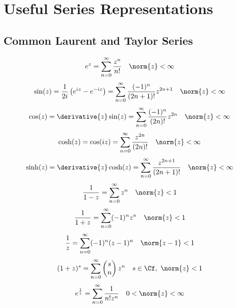 \documentclass[../mmf.tex]{subfiles}
\begin{document}
\chapter{Useful Series Representations}
\section{Common Laurent and Taylor Series}
\begin{equation}
	e^z=\sum_{n=0}^\infty\frac{z^n}{n!}\quad\norm{z}<\infty
	\label{eq:expser}
\end{equation}
\begin{equation}
	\sin(z)=\frac{1}{2i}\left( e^{iz}-e^{-iz} \right)=\sum_{n=0}^{\infty}\frac{(-1)^n}{(2n+1)!}z^{2n+1}\quad\norm{z}<\infty
	\label{eq:sinser}
\end{equation}
\begin{equation}
	\cos(z)=\derivative{z}\sin(z)=\sum_{n=0}^{\infty}\frac{(-1)^n}{(2n)!}z^{2n}\quad\norm{z}<\infty
	\label{eq:cosser}
\end{equation}
\begin{equation}
	\cosh(z)=\cos(iz)=\sum_{n=0}^{\infty}\frac{z^{2n}}{(2n)!}\quad\norm{z}<\infty
	\label{eq:coshser}
\end{equation}
\begin{equation}
	\sinh(z)=\derivative{z}\cosh(z)=\sum_{n=0}^{\infty}\frac{z^{2n+1}}{(2n+1)!}\quad\norm{z}<\infty
	\label{eq:sinhser}
\end{equation}
\begin{equation}
	\frac{1}{1-z}=\sum_{n=0}^{\infty}z^n\quad\norm{z}<1
	\label{eq:geomser}
\end{equation}
\begin{equation}
	\frac{1}{1+z}=\sum_{n=0}^{\infty}(-1)^nz^n\quad\norm{z}<1
	\label{eq:geomminoneser}
\end{equation}
\begin{equation}
	\frac{1}{z}=\sum_{n=0}^{\infty}(-1)^n(z-1)^n\quad\norm{z-1}<1
	\label{eq:zminoneser}
\end{equation}
\begin{equation}
	(1+z)^s=\sum_{n=0}^{\infty}\begin{pmatrix}s\\n\end{pmatrix}z^n\quad s\in\Cf,\ \norm{z}<1
	\label{eq:binomser}
\end{equation}
\begin{equation}
	e^{\frac{1}{z}}=\sum_{n=0}^{\infty}\frac{1}{n!z^n}\quad0<\norm{z}<\infty
	\label{eq:explaur}
\end{equation}
\end{document}
